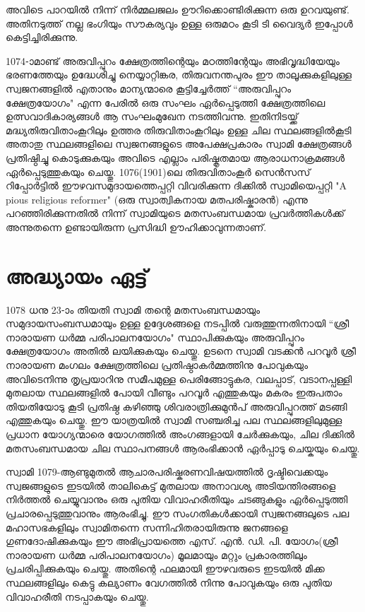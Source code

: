 \documentclass[12pt,openany]{book}
\begin{document}
	അവിടെ പാറയിൽ നിന്ന് നിർമ്മലജലം ഊറിക്കൊണ്ടിരിക്കുന്ന ഒരു ഉറവയുണ്ട്. അതിനടുത്ത് നല്ല ഭംഗിയും സൗകര്യവും ഉള്ള ഒരുമഠം കൂടി ടി വൈദ്യർ ഇപ്പോൾ കെട്ടിച്ചിരിക്കുന്നു.
	
	1074-ാമാണ്ട് അരുവിപ്പുറം ക്ഷേത്രത്തിന്റെയും മഠത്തിന്റേയും അഭിവൃദ്ധിയേയും ഭരണത്തേയും ഉദ്ധേശിച്ചു നെയ്യാറ്റിങ്കര, തിരുവനന്തപുരം ഈ താലൂക്കുകളിലുള്ള സ്വജനങ്ങളിൽ എതാനും മാന്യന്മാരെ കൂട്ടിച്ചേർത്ത് ``അരുവിപ്പുറം ക്ഷേത്രയോഗം" എന്ന പേരിൽ ഒരു സംഘം ഏർപ്പെടുത്തി ക്ഷേത്രത്തിലെ ഉത്സവാദികാര്യങ്ങൾ ആ സംഘംമുഖേന നടത്തിവന്നു. ഇതിനിടയ്ക്ക് മദ്ധ്യതിരുവിതാംകൂറിലും ഉത്തര തിരുവിതാംകൂറിലും ഉള്ള ചില സ്ഥലങ്ങളിൽകൂടി അതാതു സ്ഥലങ്ങളിലെ സ്വജനങ്ങളുടെ അപേക്ഷപ്രകാരം സ്വാമി ക്ഷേത്രങ്ങൾ പ്രതിഷ്ഠിച്ചു കൊടുക്കുകയും അവിടെ എല്ലാം പരിഷ്കൃതമായ ആരാധനാക്രമങ്ങൾ ഏർപ്പെടുത്തുകയും ചെയ്തു. 1076(1901)ലെ തിരുവിതാംകൂർ സെൻസസ് റിപ്പോർട്ടിൽ ഈഴവസമുദായത്തെപ്പറ്റി വിവരിക്കുന്ന ദിക്കിൽ സ്വാമിയെപ്പറ്റി "A pious religious reformer" (ഒരു സ്വാത്വികനായ മതപരിഷ്കാരൻ) എന്നു പറഞ്ഞിരിക്കുന്നതിൽ നിന്ന് സ്വാമിയുടെ മതസംബന്ധമായ പ്രവർത്തികൾക്ക് അന്നുതന്നെ ഉണ്ടായിരുന്ന പ്രസിദ്ധി ഊഹിക്കാവുന്നതാണ്.
	
	\newpage
	
	\chapter*{അദ്ധ്യായം ഏട്ട്}
	
	1078 ധനു 23-ാം തിയതി സ്വാമി തന്റെ മതസംബന്ധമായും സമുദായസംബന്ധമായും ഉള്ള ഉദ്ദേശങ്ങളെ നടപ്പിൽ വരുത്തുന്നതിനായി ``ശ്രീ നാരായണ ധർമ്മ പരിപാലനയോഗം" സ്ഥാപിക്കുകയും അരുവിപ്പുറം ക്ഷേത്രയോഗം അതിൽ ലയിക്കുകയും ചെയ്തു. ഉടനെ സ്വാമി വടക്കൻ പറവൂർ ശ്രീ നാരായണ മംഗലം ക്ഷേത്രത്തിലെ പ്രതിഷ്ഠാകർമ്മത്തിനു പോവുകയും അവിടെനിന്നു തൃപ്രയാറിനു സമീപമുള്ള പെരിങ്ങോട്ടുകര, വലപ്പാട്, വടാനപ്പള്ളി മുതലായ സ്ഥലങ്ങളിൽ പോയി വീണ്ടും പറവൂർ എത്തുകയും മകരം ഇരുപതാം തിയതിയോടു കൂടി പ്രതിഷ്ഠ കഴിഞ്ഞു ശിവരാത്രിക്കുമുൻപ് അരുവിപ്പുറത്ത് മടങ്ങി എത്തുകയും ചെയ്തു. ഈ യാത്രയിൽ സ്വാമി സഞ്ചരിച്ച പല സ്ഥലങ്ങളിലുമുള്ള പ്രധാന യോഗ്യന്മാരെ യോഗത്തിൽ അംഗങ്ങളായി ചേർക്കുകയും, ചില ദിക്കിൽ മതസംബന്ധമായ ചില സ്ഥാപനങ്ങൾ ആരംഭിക്കാൻ ഏർപ്പാടു ചെയ്കയും ചെയ്തു.
	
	സ്വാമി 1079-ആണ്ടുമുതൽ ആചാരപരിഷ്കരണവിഷയത്തിൽ ദൃഷ്ടിവെക്കയും സ്വജങ്ങളുടെ ഇടയിൽ താലികെട്ട് മുതലായ അനാവശ്യ അടിയന്തിരങ്ങളെ നിർത്തൽ ചെയ്യുവാനും ഒരു പുതിയ വിവാഹരീതിയും ചടങ്ങുകളും ഏർപ്പെടുത്തി പ്രചാരപ്പെടുത്തുവാനും ആരംഭിച്ചു. ഈ സംഗതികൾക്കായി സ്വജനങ്ങലുടെ പല മഹാസഭകളിലും സ്വാമിതന്നെ സന്നിഹിതരായിരുന്നു ജനങ്ങളെ ഗുണദോഷിക്കുകയും ഈ അഭിപ്രായത്തെ എസ്. എൻ. ഡി. പി. യോഗം(ശ്രീ നാരായണ ധർമ്മ പരിപാലനയോഗം) മൂലമായും മറ്റും പ്രകാരത്തിലും പ്രചരിപ്പിക്കുകയും ചെയ്തു. അതിന്റെ ഫലമായി ഈഴവരുടെ ഇടയിൽ മിക്ക സ്ഥലങ്ങളിലും കെട്ടു കല്യാണം വേഗത്തിൽ നിന്നു പോവുകയും ഒരു പുതിയ വിവാഹരീതി നടപ്പാകയും ചെയ്തു.
	
\end{document}
